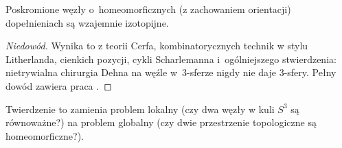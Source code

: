 \begin{theorem}
%
%
%
    Poskromione węzły o~homeomorficznych (z zachowaniem orientacji) dopełnieniach są wzajemnie izotopijne.
\end{theorem}

\begin{proof}[Niedowód]
    Wynika to z teorii Cerfa, kombinatorycznych technik w stylu Litherlanda, cienkich pozycji, cykli Scharlemanna i~ogólniejszego stwierdzenia: nietrywialna chirurgia Dehna na węźle w~3-sferze nigdy nie daje 3-sfery.
%
%
%
    Pełny dowód zawiera praca \cite{gordon1989}.
\end{proof}

Twierdzenie to zamienia problem lokalny (czy dwa węzły w kuli $S^3$ są równoważne?) na problem globalny (czy dwie przestrzenie topologiczne są homeomorficzne?).
%


